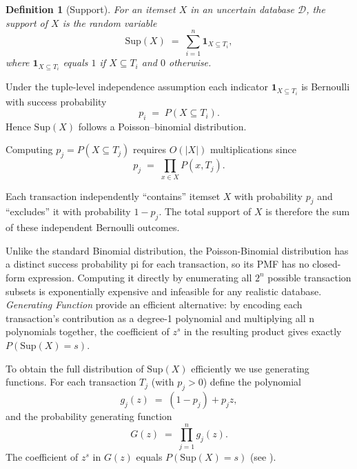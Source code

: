 \documentclass[10pt,letterpaper]{article}
\newtheorem{definition}{Definition}[section]
\newcounter{definition}
\begin{document}
\begin{definition}[Support]
\label{def:support}
For an itemset $X$ in an uncertain database $\mathcal{D}$, the support of $X$ is the random variable
\begin{equation}
\mathrm{Sup}(X) \;=\; \sum_{i=1}^n \mathbf{1}_{X\subseteq T_i},
\label{eq:Sup}
\end{equation}
where $\mathbf{1}_{X\subseteq T_i}$ equals $1$ if $X\subseteq T_i$ and $0$ otherwise.
\end{definition}

Under the tuple-level independence assumption each indicator $\mathbf{1}_{X\subseteq T_i}$ is Bernoulli with success probability
\begin{equation}
p_i \;=\; P(X\subseteq T_i).
\label{eq:pi}
\end{equation}
Hence $\mathrm{Sup}(X)$ follows a Poisson--binomial distribution.

Computing $p_j=P(X\subseteq T_j)$ requires $O(|X|)$ multiplications since
\begin{equation}
p_j \;=\; \prod_{x\in X} P(x,T_j).
\label{eq:pj}
\end{equation}

Each transaction independently ``contains'' itemset $X$ with probability $p_j$
and ``excludes'' it with probability $1 - p_j$. The total support of $X$ is
therefore the sum of these independent Bernoulli outcomes. 

Unlike the standard Binomial distribution, the Poisson-Binomial distribution has a distinct success probability pi for each transaction, so its PMF has no closed-form expression. Computing it directly by enumerating all $2^n$ possible transaction subsets is exponentially expensive and infeasible for any realistic database. \emph{Generating Function}
provide an efficient alternative: by encoding each transaction's contribution as a degree-1 polynomial and multiplying all n polynomials together, the coefficient of $z^s$ in the resulting product gives exactly $P(\mathrm{Sup}(X) = s)$.

To obtain the full distribution of $\mathrm{Sup}(X)$ efficiently we use generating functions. For each transaction $T_j$ (with $p_j>0$) define the polynomial
\begin{equation}
g_j(z) \;=\; (1-p_j) + p_j z,
\label{eq:gj}
\end{equation}
and the probability generating function
\begin{equation}
G(z) \;=\; \prod_{j=1}^n g_j(z).
\label{eq:Gz}
\end{equation}
The coefficient of $z^s$ in $G(z)$ equals $P(\mathrm{Sup}(X)=s)$ (see \cite{bib3}).
\end{document}
